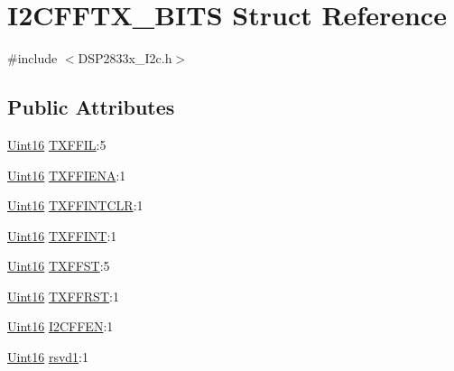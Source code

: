 \hypertarget{struct_i2_c_f_f_t_x___b_i_t_s}{}\section{I2\+C\+F\+F\+T\+X\+\_\+\+B\+I\+T\+S Struct Reference}
\label{struct_i2_c_f_f_t_x___b_i_t_s}


{\ttfamily \#include $<$D\+S\+P2833x\+\_\+\+I2c.\+h$>$}

\subsection*{Public Attributes}
\begin{DoxyCompactItemize}
\item 
\hyperlink{_d_s_p2833x___device_8h_a59a9f6be4562c327cbfb4f7e8e18f08b}{Uint16} \hyperlink{struct_i2_c_f_f_t_x___b_i_t_s_aa0a00aae83c4af9209f91c9c00f25154}{T\+X\+F\+F\+I\+L}\+:5
\item 
\hyperlink{_d_s_p2833x___device_8h_a59a9f6be4562c327cbfb4f7e8e18f08b}{Uint16} \hyperlink{struct_i2_c_f_f_t_x___b_i_t_s_a2d8da2df7de70a24d0e94a889a07a7f9}{T\+X\+F\+F\+I\+E\+N\+A}\+:1
\item 
\hyperlink{_d_s_p2833x___device_8h_a59a9f6be4562c327cbfb4f7e8e18f08b}{Uint16} \hyperlink{struct_i2_c_f_f_t_x___b_i_t_s_ad3323bce272911606d49ac45a94c8180}{T\+X\+F\+F\+I\+N\+T\+C\+L\+R}\+:1
\item 
\hyperlink{_d_s_p2833x___device_8h_a59a9f6be4562c327cbfb4f7e8e18f08b}{Uint16} \hyperlink{struct_i2_c_f_f_t_x___b_i_t_s_a3b0620fc5d20d63019d6ec87e090c3df}{T\+X\+F\+F\+I\+N\+T}\+:1
\item 
\hyperlink{_d_s_p2833x___device_8h_a59a9f6be4562c327cbfb4f7e8e18f08b}{Uint16} \hyperlink{struct_i2_c_f_f_t_x___b_i_t_s_a9164d0f846b070f67b2db6d3da7a7c08}{T\+X\+F\+F\+S\+T}\+:5
\item 
\hyperlink{_d_s_p2833x___device_8h_a59a9f6be4562c327cbfb4f7e8e18f08b}{Uint16} \hyperlink{struct_i2_c_f_f_t_x___b_i_t_s_a13f0b963e09d17eb9187e11a850e50ca}{T\+X\+F\+F\+R\+S\+T}\+:1
\item 
\hyperlink{_d_s_p2833x___device_8h_a59a9f6be4562c327cbfb4f7e8e18f08b}{Uint16} \hyperlink{struct_i2_c_f_f_t_x___b_i_t_s_a8cebf27a41e8ee59fd13252946b52e1e}{I2\+C\+F\+F\+E\+N}\+:1
\item 
\hyperlink{_d_s_p2833x___device_8h_a59a9f6be4562c327cbfb4f7e8e18f08b}{Uint16} \hyperlink{struct_i2_c_f_f_t_x___b_i_t_s_a947b3e4aaa1264cedf56ac5941c454e2}{rsvd1}\+:1
\end{DoxyCompactItemize}



